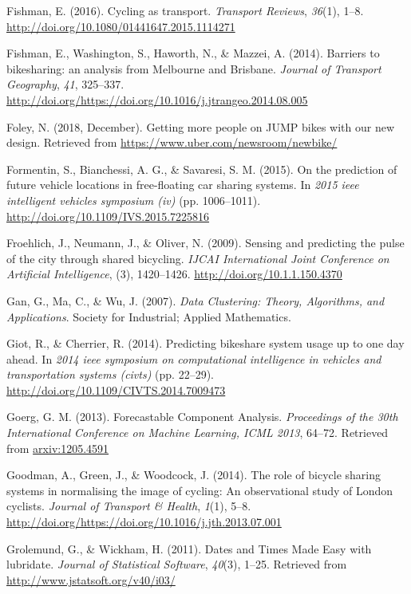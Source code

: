 \documentclass[12pt,oneside]{reedthesis}
\begin{document}
\hypertarget{ref-fishman2016}{}
Fishman, E. (2016). Cycling as transport. \emph{Transport Reviews},
\emph{36}(1), 1--8. \url{http://doi.org/10.1080/01441647.2015.1114271}

\hypertarget{ref-fishman2014}{}
Fishman, E., Washington, S., Haworth, N., \& Mazzei, A. (2014). Barriers
to bikesharing: an analysis from Melbourne and Brisbane. \emph{Journal
of Transport Geography}, \emph{41}, 325--337.
\url{http://doi.org/https://doi.org/10.1016/j.jtrangeo.2014.08.005}

\hypertarget{ref-foley2018}{}
Foley, N. (2018, December). Getting more people on JUMP bikes with our
new design. Retrieved from \url{https://www.uber.com/newsroom/newbike/}

\hypertarget{ref-formentin2015}{}
Formentin, S., Bianchessi, A. G., \& Savaresi, S. M. (2015). On the
prediction of future vehicle locations in free-floating car sharing
systems. In \emph{2015 ieee intelligent vehicles symposium (iv)} (pp.
1006--1011). \url{http://doi.org/10.1109/IVS.2015.7225816}

\hypertarget{ref-froehlich2009}{}
Froehlich, J., Neumann, J., \& Oliver, N. (2009). Sensing and predicting
the pulse of the city through shared bicycling. \emph{IJCAI
International Joint Conference on Artificial Intelligence}, (3),
1420--1426. \url{http://doi.org/10.1.1.150.4370}

\hypertarget{ref-gan2007}{}
Gan, G., Ma, C., \& Wu, J. (2007). \emph{Data Clustering: Theory,
Algorithms, and Applications}. Society for Industrial; Applied
Mathematics.

\hypertarget{ref-giot2014}{}
Giot, R., \& Cherrier, R. (2014). Predicting bikeshare system usage up
to one day ahead. In \emph{2014 ieee symposium on computational
intelligence in vehicles and transportation systems (civts)} (pp.
22--29). \url{http://doi.org/10.1109/CIVTS.2014.7009473}

\hypertarget{ref-goerg2013}{}
Goerg, G. M. (2013). Forecastable Component Analysis. \emph{Proceedings
of the 30th International Conference on Machine Learning, ICML 2013},
64--72. Retrieved from \url{arxiv:1205.4591}

\hypertarget{ref-goodman2014}{}
Goodman, A., Green, J., \& Woodcock, J. (2014). The role of bicycle
sharing systems in normalising the image of cycling: An observational
study of London cyclists. \emph{Journal of Transport \& Health},
\emph{1}(1), 5--8.
\url{http://doi.org/https://doi.org/10.1016/j.jth.2013.07.001}

\hypertarget{ref-lubridate}{}
Grolemund, G., \& Wickham, H. (2011). Dates and Times Made Easy with
lubridate. \emph{Journal of Statistical Software}, \emph{40}(3), 1--25.
Retrieved from \url{http://www.jstatsoft.org/v40/i03/}
\end{document}
